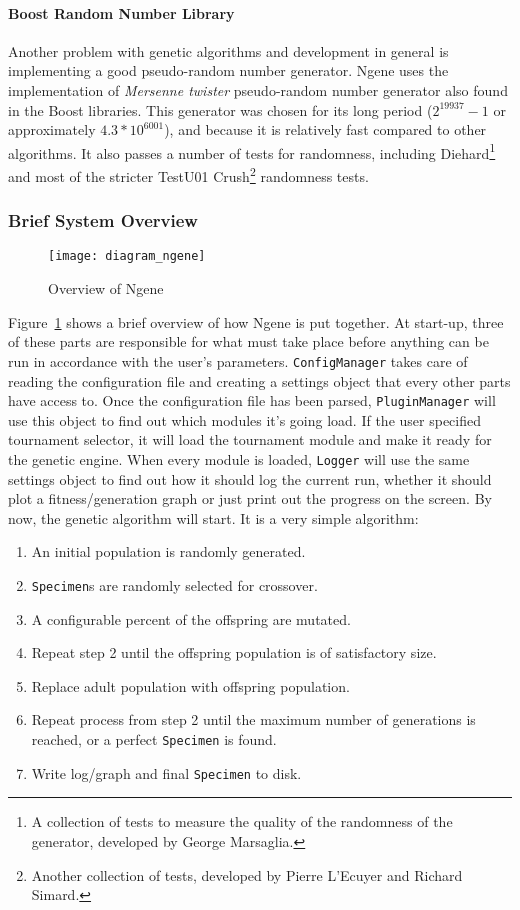 \paragraph{\textbf{Boost Random Number Library}}\cite{maurer2000}
Another problem with genetic algorithms and development in general is implementing a good pseudo-random number generator. Ngene uses the implementation of \emph{Mersenne twister} pseudo-random number generator also found in the Boost libraries. This generator was chosen for its long period ($2^{19937}-1$ or approximately $4.3*10^{6001}$), and because it is relatively fast compared to other algorithms. It also passes a number of tests for randomness, including Diehard\footnote{A collection of tests to measure the quality of the randomness of the generator, developed by George Marsaglia.} and most of the stricter TestU01 Crush\footnote{Another collection of tests, developed by Pierre L'Ecuyer and Richard Simard.} randomness tests.

\subsubsection{Brief System Overview}
\begin{figure}[!ht]
	\centering
	\texttt{[image: diagram\_ngene]}
	\caption{Overview of Ngene}
	\label{fig:diagram_ngene}
\end{figure}

Figure~\ref{fig:diagram_ngene} shows a brief overview of how Ngene is put together. At start-up, three of these parts are responsible for what must take place before anything can be run in accordance with the user's parameters. \texttt{ConfigManager} takes care of reading the configuration file and creating a settings object that every other parts have access to. Once the configuration file has been parsed, \texttt{PluginManager} will use this object to find out which modules it's going load. If the user specified tournament selector, it will load the tournament module and make it ready for the genetic engine. When every module is loaded, \texttt{Logger} will use the same settings object to find out how it should log the current run, whether it should plot a fitness/generation graph or just print out the progress on the screen. By now, the genetic algorithm will start. It is a very simple algorithm:

\begin{enumerate}
	\itemsep=0pt
	\item An initial population is randomly generated.
	\item \texttt{Specimen}s are randomly selected for crossover.
	\item A configurable percent of the offspring are mutated.
	\item Repeat step 2 until the offspring population is of satisfactory size.
	\item Replace adult population with offspring population.
	\item Repeat process from step 2 until the maximum number of generations is reached, or a perfect \texttt{Specimen} is found.
	\item Write log/graph and final \texttt{Specimen} to disk.
\end{enumerate}

